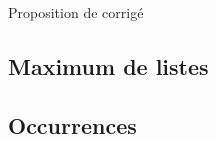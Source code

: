 
\vspace{0.1cm}
\begin{huge}
 Proposition de corrigé
\end{huge}

\subsection{Maximum de listes}
\setcounter{thequestion}{0}
\subsection{Occurrences}
\setcounter{thequestion}{0}

